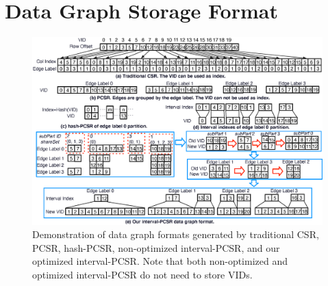 


\section{Data Graph Storage Format\label{sec:storage}}
\begin{figure}
\centering
\includegraphics[width=\textwidth]{./figure/graphformat.eps}
\caption{Demonstration of data graph formats generated by traditional CSR, PCSR, hash-PCSR, non-optimized interval-PCSR, and our optimized interval-PCSR. Note that both non-optimized and optimized interval-PCSR do not need to store VIDs.}	
\label{fig:dataformat}
\end{figure}

